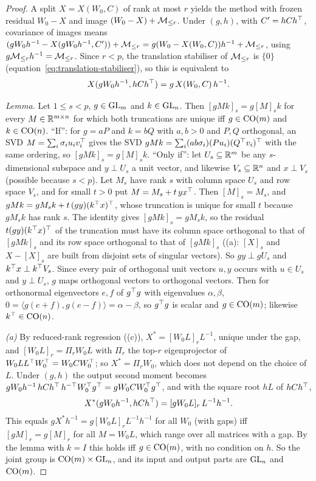 \begin{proof}
A split $X=X(W_0,C)$ of rank at most $r$ yields the method with frozen residual $W_0-X$ and image $(W_0-X)+\mathcal{M}_{\le r}$. Under $(g,h)$,
with $C'=hCh^{\top}$, covariance of images means $(gW_0h^{-1}-X(gW_0h^{-1},C'))+\mathcal{M}_{\le r}=g(W_0-X(W_0,C))h^{-1}+\mathcal{M}_{\le r}$, using $g\mathcal{M}_{\le r} h^{-1}=\mathcal{M}_{\le r}$.
Since $r<p$, the translation stabiliser of $\mathcal{M}_{\le r}$ is $\{0\}$ (equation~\eqref{eq:translation-stabiliser}), so this is equivalent to
\begin{equation*}
  X(gW_0h^{-1},hCh^{\top})=g\,X(W_0,C)\,h^{-1}.
\end{equation*}

\emph{Lemma.} Let $1\le s<p$, $g\in\mathrm{GL}_m$ and $k\in\mathrm{GL}_n$. Then $[gMk]_s=g[M]_sk$ for every $M\in\mathbb{R}^{m\times n}$ for which both
truncations are unique iff $g\in\mathrm{CO}(m)$ and $k\in\mathrm{CO}(n)$. ``If'': for $g=aP$ and $k=bQ$ with $a,b>0$ and $P,Q$ orthogonal, an
SVD $M=\sum_i\sigma_iu_iv_i^{\top}$ gives the SVD $gMk=\sum_i(ab\sigma_i)(Pu_i)(Q^{\top} v_i)^{\top}$ with the same ordering, so
$[gMk]_s=g[M]_sk$. ``Only if'': let $U_s\subseteq\mathbb{R}^m$ be any $s$-dimensional subspace and $y\perp U_s$ a unit vector, and
likewise $V_s\subseteq\mathbb{R}^n$ and $x\perp V_s$ (possible because $s<p$). Let $M_s$ have rank $s$ with column space $U_s$ and row
space $V_s$, and for small $t>0$ put $M=M_s+t\,yx^{\top}$. Then $[M]_s=M_s$, and $gMk=gM_sk+t\,(gy)(k^{\top} x)^{\top}$, whose truncation is
unique for small $t$ because $gM_sk$ has rank $s$. The identity gives $[gMk]_s=gM_sk$, so the residual $t(gy)(k^{\top} x)^{\top}$ of the
truncation must have its column space orthogonal to that of $[gMk]_s$ and its row space orthogonal to that of $[gMk]_s$
((a): $[X]_s$ and $X-[X]_s$ are built from disjoint sets of singular vectors). So $gy\perp gU_s$ and
$k^{\top} x\perp k^{\top} V_s$. Since every pair of orthogonal unit vectors $u,y$ occurs with $u\in U_s$ and $y\perp U_s$, $g$ maps
orthogonal vectors to orthogonal vectors. Then for orthonormal eigenvectors $e,f$ of $g^{\top} g$ with eigenvalues $\alpha,\beta$,
$0=\langle g(e+f),g(e-f)\rangle=\alpha-\beta$, so $g^{\top} g$ is scalar and $g\in\mathrm{CO}(m)$; likewise $k^{\top}\in\mathrm{CO}(n)$.

\emph{(a)} By reduced-rank regression ((c)), $X^*=[W_0L]_rL^{-1}$, unique under the gap, and $[W_0L]_r=\Pi_rW_0L$
with $\Pi_r$ the top-$r$ eigenprojector of $W_0LL^{\top} W_0^{\top}=W_0CW_0^{\top}$; so $X^*=\Pi_rW_0$, which does not depend on the choice of
$L$. Under $(g,h)$ the output second moment becomes $gW_0h^{-1}\,hCh^{\top}\,h^{-\top}W_0^{\top} g^{\top}=gW_0CW_0^{\top} g^{\top}$, and with the square
root $hL$ of $hCh^{\top}$,
\begin{equation*}
  X^*(gW_0h^{-1},hCh^{\top})=[gW_0L]_r\,L^{-1}h^{-1}.
\end{equation*}
This equals $gX^*h^{-1}=g[W_0L]_rL^{-1}h^{-1}$ for all $W_0$ (with gaps) iff $[gM]_r=g[M]_r$ for all $M=W_0L$, which range
over all matrices with a gap. By the lemma with $k=I$ this holds iff $g\in\mathrm{CO}(m)$, with no condition on $h$. So the joint group
is $\mathrm{CO}(m)\times\mathrm{GL}_n$, and its input and output parts are $\mathrm{GL}_n$ and $\mathrm{CO}(m)$.


\end{proof}
